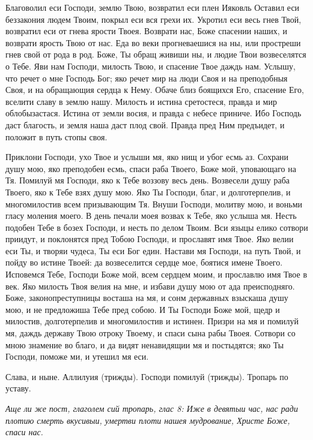 Благоволил еси Господи, землю Твою, возвратил еси плен Ияковль Оставил еси беззакония людем Твоим, покрыл еси вся грехи их. Укротил еси весь гнев Твой, возвратил еси от гнева ярости Твоея. Возврати нас, Боже спасении наших, и возврати ярость Твою от нас. Еда во веки прогневаешися на ны, или простреши гнев свой от рода в род. Боже, Ты обращ живиши ны, и людие Твои возвеселятся о Тебе. Яви нам Господи, милость Твою, и спасение Твое даждь нам. Услышу, что речет о мне Господь Бог; яко речет мир на люди Своя и на преподобныя Своя, и на обращающия сердца к Нему. Обаче близ боящихся Его, спасение Его, вселити славу в землю нашу. Милость и истина сретостеся, правда и мир облобызастася. Истина от земли восия, и правда с небесе приниче. Ибо Господь даст благость, и земля наша даст плод свой. Правда пред Ним предъидет, и положит в путь стопы своя.




Приклони Господи, ухо Твое и услыши мя, яко нищ и убог есмь аз. Сохрани душу мою, яко преподобен есмь, спаси раба Твоего, Боже мой, уповающаго на Тя. Помилуй мя Господи, яко к Тебе воззову весь день. Возвесели душу раба Твоего, яко к Тебе взях душу мою. Яко Ты Господи, благ, и долготерпелив, и многомилостив всем призывающим Тя. Внуши Господи, молитву мою, и воньми гласу моления моего. В день печали моея возвах к Тебе, яко услыша мя. Несть подобен Тебе в бозех Господи, и несть по делом Твоим. Вси языцы елико сотвори приидут, и поклонятся пред Тобою Господи, и прославят имя Твое. Яко велии еси Ты, и творяи чудеса, Ты еси Бог един. Настави мя Господи, на путь Твой, и пойду во истине Твоей: да возвеселится сердце мое, боятися имене Твоего. Исповемся Тебе, Господи Боже мой, всем сердцем моим, и прославлю имя Твое в век. Яко милость Твоя велия на мне, и избави душу мою от ада преисподняго. Боже, законопреступницы восташа на мя, и сонм державных взыскаша душу мою, и не предложиша Тебе пред собою. И Ты Господи Боже мой, щедр и милостив, долготерпелив и многомилостив и истинен. Призри на мя и помилуй мя, даждь державу Твою отроку Твоему, и спаси сына рабы Твоея. Сотвори со мною знамение во благо, и да видят ненавидящии мя и постыдятся; яко Ты Господи, поможе ми, и утешил мя еси.

Слава, и ныне. Аллилуия (трижды). Господи помилуй (трижды). Тропарь по уставу.


\itshape Аще ли же пост, глаголем сий тропарь, глас 8:\normalfont{} Иже в девятыи час, нас ради плотию смерть вкусивыи, умертви плоти нашея мудрование, Христе Боже, спаси нас.


